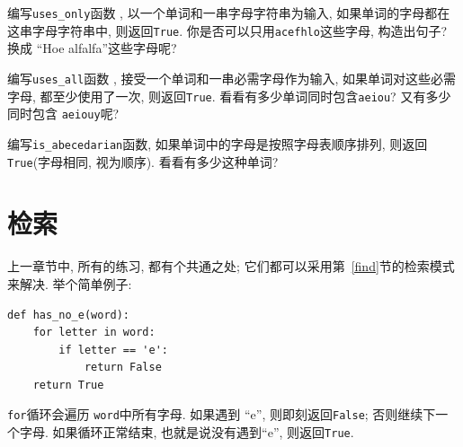 \documentclass[10pt]{book}
\begin{document}
\begin{exercise}
编写\verb"uses_only"函数 , 以一个单词和一串字母字符串为输入, 
如果单词的字母都在这串字母字符串中, 则返回{\tt True}.
你是否可以只用{\tt acefhlo}这些字母, 构造出句子?
换成 ``Hoe alfalfa''这些字母呢?

\end{exercise}


\begin{exercise} 
编写\verb"uses_all"函数 , 接受一个单词和一串必需字母作为输入, 
如果单词对这些必需字母, 都至少使用了一次, 则返回{\tt True}. 
看看有多少单词同时包含{\tt aeiou}? 又有多少同时包含 {\tt aeiouy}呢?

\end{exercise}


\begin{exercise}
编写\verb"is_abecedarian"函数, 如果单词中的字母是按照字母表顺序排列, 
则返回 {\tt True}(字母相同, 视为顺序). 看看有多少这种单词?


\end{exercise}

\section{检索}
\label{search}

上一章节中, 所有的练习, 都有个共通之处;
它们都可以采用第~\ref{find}节的检索模式来解决. 
举个简单例子:

\begin{verbatim}
def has_no_e(word):
    for letter in word:
        if letter == 'e':
            return False
    return True
\end{verbatim}
%
{\tt for}循环会遍历 {\tt word}中所有字母. 
如果遇到 ``e'', 则即刻返回{\tt False};
否则继续下一个字母. 
如果循环正常结束, 也就是说没有遇到``e'',  则返回{\tt True}.
\end{document}
